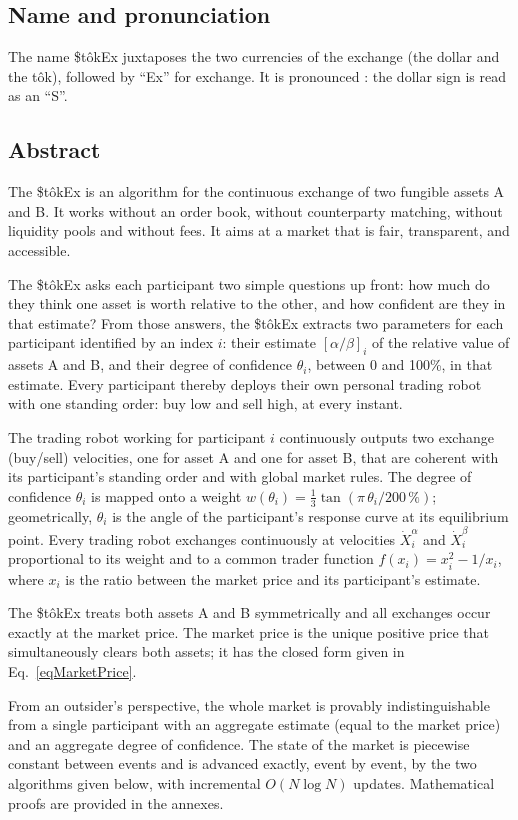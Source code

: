 \documentclass[letterpaper]{article}
\newcommand{\priceAB}{\left[\alpha / \beta\right]}
\newcommand{\StokEx}{\$t\^{o}kEx}
\newcommand{\tok}{t\^{o}k}
\begin{document}
\subsection*{Name and pronunciation}
The name \StokEx{} juxtaposes the two currencies of the exchange (the dollar and the \tok{}), followed by ``Ex'' for exchange. It is pronounced \textipa{[stOkEks]}: the dollar sign is read as an ``S''.

\subsection*{Abstract}
The \StokEx{} is an algorithm for the continuous exchange of two fungible assets A and B. It works without an order book, without counterparty matching, without liquidity pools and without fees. It aims at a market that is fair, transparent, and accessible.

The \StokEx{} asks each participant two simple questions up front: how much do they think one asset is worth relative to the other, and how confident are they in that estimate? From those answers, the \StokEx{} extracts two parameters for each participant identified by an index $i$: their estimate $\priceAB_i$ of the relative value of assets A and B, and their degree of confidence $\theta_i$, between 0 and 100\%, in that estimate. Every participant thereby deploys their own personal trading robot with one standing order: buy low and sell high, at every instant.

The trading robot working for participant $i$ continuously outputs two exchange (buy/sell) velocities, one for asset A and one for asset B, that are coherent with its participant's standing order and with global market rules. The degree of confidence $\theta_i$ is mapped onto a weight $w(\theta_i) = \frac{1}{3}\tan\left(\pi\,\theta_i/200\,\%\right)$; geometrically, $\theta_i$ is the angle of the participant's response curve at its equilibrium point. Every trading robot exchanges continuously at velocities $\dot{X}_i^\alpha$ and $\dot{X}_i^\beta$ proportional to its weight and to a common trader function $f(x_i) = x_i^2 - 1/x_i$, where $x_i$ is the ratio between the market price and its participant's estimate.

The \StokEx{} treats both assets A and B symmetrically and all exchanges occur exactly at the market price. The market price is the unique positive price that simultaneously clears both assets; it has the closed form given in Eq.~\eqref{eqMarketPrice}.

From an outsider's perspective, the whole market is provably indistinguishable from a single participant with an aggregate estimate (equal to the market price) and an aggregate degree of confidence. The state of the market is piecewise constant between events and is advanced exactly, event by event, by the two algorithms given below, with incremental $O(N \log N)$ updates. Mathematical proofs are provided in the annexes.
\end{document}

